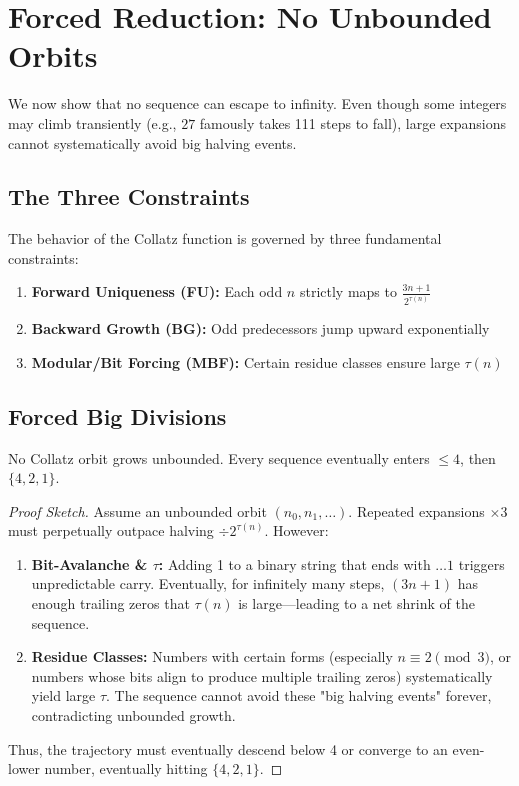 \section{Forced Reduction: No Unbounded Orbits}\label{sec:forced_reduction}

We now show that no sequence can escape to infinity. Even though some integers may climb transiently (e.g., $27$ famously takes 111 steps to fall), large expansions cannot systematically avoid big halving events.

\subsection{The Three Constraints}

The behavior of the Collatz function is governed by three fundamental constraints:

\begin{enumerate}
\item \textbf{Forward Uniqueness (FU):} Each odd $n$ strictly maps to $\frac{3n +1}{2^{\tau(n)}}$
\item \textbf{Backward Growth (BG):} Odd predecessors jump upward exponentially
\item \textbf{Modular/Bit Forcing (MBF):} Certain residue classes ensure large $\tau(n)$
\end{enumerate}

\subsection{Forced Big Divisions}

\begin{theorem}
No Collatz orbit grows unbounded. Every sequence eventually enters $\leq 4$, then $\{4,2,1\}$.
\end{theorem}

\begin{proof}[Proof Sketch]
Assume an unbounded orbit $(n_0, n_1, \dots)$. Repeated expansions $\times 3$ must perpetually outpace halving $\div 2^{\tau(n)}$. However:

\begin{enumerate}
\item \textbf{Bit-Avalanche \& $\tau$:}
   Adding 1 to a binary string that ends with $\dots 1$ triggers unpredictable carry. Eventually, for infinitely many steps, $(3n+1)$ has enough trailing zeros that $\tau(n)$ is large—leading to a net shrink of the sequence.

\item \textbf{Residue Classes:}
   Numbers with certain forms (especially $n\equiv 2\pmod{3}$, or numbers whose bits align to produce multiple trailing zeros) systematically yield large $\tau$. The sequence cannot avoid these "big halving events" forever, contradicting unbounded growth.
\end{enumerate}

Thus, the trajectory must eventually descend below 4 or converge to an even-lower number, eventually hitting $\{4,2,1\}$.
\end{proof}

